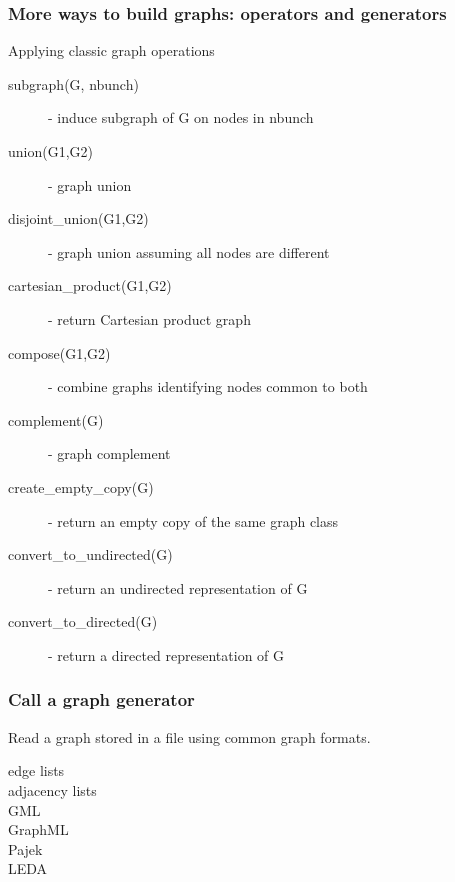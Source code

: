 \documentclass[xcolor=dvipsnames, 9pt]{beamer}
\begin{document}
\begin{frame}[fragile]
\frametitle{More ways to build graphs: operators and generators}

Applying classic graph operations

\begin{description}

\item[subgraph(G, nbunch)]      - induce subgraph of G on nodes in nbunch
\item[union(G1,G2)]             - graph union
\item[disjoint\_union(G1,G2)]    - graph union assuming all nodes are different
\item[cartesian\_product(G1,G2)] - return Cartesian product graph
\item[compose(G1,G2)]           - combine graphs identifying nodes common to both
\item[complement(G)]            - graph complement 
\item[create\_empty\_copy(G)]     - return an empty copy of the same graph class
\item[convert\_to\_undirected(G)] - return an undirected representation of G
\item[convert\_to\_directed(G)]   - return a directed representation of G
\end{description}

\end{frame}

\begin{frame}
\frametitle{Call a graph generator}


\end{frame}

\begin{frame}
 Read a graph stored in a file using common graph formats. 
\begin{description}
\item [edge lists]
\item [adjacency lists]
\item [GML]
\item [GraphML]
\item [Pajek]
\item [LEDA]
\end{description}

\end{frame}
\end{document}

